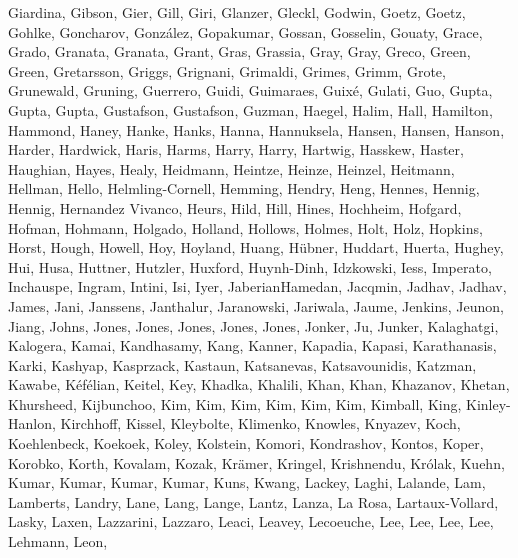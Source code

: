 \documentclass[times,tight]{aastex631}
\begin{document}
\begin{thebibliography}{}
{  {Giardina}, {Gibson}, {Gier}, {Gill}, {Giri}, {Glanzer}, {Gleckl}, {Godwin},
  {Goetz}, {Goetz}, {Gohlke}, {Goncharov}, {Gonz{\'a}lez}, {Gopakumar},
  {Gossan}, {Gosselin}, {Gouaty}, {Grace}, {Grado}, {Granata}, {Granata},
  {Grant}, {Gras}, {Grassia}, {Gray}, {Gray}, {Greco}, {Green}, {Green},
  {Gretarsson}, {Griggs}, {Grignani}, {Grimaldi}, {Grimes}, {Grimm}, {Grote},
  {Grunewald}, {Gruning}, {Guerrero}, {Guidi}, {Guimaraes}, {Guix{\'e}},
  {Gulati}, {Guo}, {Gupta}, {Gupta}, {Gupta}, {Gustafson}, {Gustafson},
  {Guzman}, {Haegel}, {Halim}, {Hall}, {Hamilton}, {Hammond}, {Haney}, {Hanke},
  {Hanks}, {Hanna}, {Hannuksela}, {Hansen}, {Hansen}, {Hanson}, {Harder},
  {Hardwick}, {Haris}, {Harms}, {Harry}, {Harry}, {Hartwig}, {Hasskew},
  {Haster}, {Haughian}, {Hayes}, {Healy}, {Heidmann}, {Heintze}, {Heinze},
  {Heinzel}, {Heitmann}, {Hellman}, {Hello}, {Helmling-Cornell}, {Hemming},
  {Hendry}, {Heng}, {Hennes}, {Hennig}, {Hennig}, {Hernandez Vivanco}, {Heurs},
  {Hild}, {Hill}, {Hines}, {Hochheim}, {Hofgard}, {Hofman}, {Hohmann},
  {Holgado}, {Holland}, {Hollows}, {Holmes}, {Holt}, {Holz}, {Hopkins},
  {Horst}, {Hough}, {Howell}, {Hoy}, {Hoyland}, {Huang}, {H{\"u}bner},
  {Huddart}, {Huerta}, {Hughey}, {Hui}, {Husa}, {Huttner}, {Hutzler},
  {Huxford}, {Huynh-Dinh}, {Idzkowski}, {Iess}, {Imperato}, {Inchauspe},
  {Ingram}, {Intini}, {Isi}, {Iyer}, {JaberianHamedan}, {Jacqmin}, {Jadhav},
  {Jadhav}, {James}, {Jani}, {Janssens}, {Janthalur}, {Jaranowski}, {Jariwala},
  {Jaume}, {Jenkins}, {Jeunon}, {Jiang}, {Johns}, {Jones}, {Jones}, {Jones},
  {Jones}, {Jones}, {Jonker}, {Ju}, {Junker}, {Kalaghatgi}, {Kalogera},
  {Kamai}, {Kandhasamy}, {Kang}, {Kanner}, {Kapadia}, {Kapasi}, {Karathanasis},
  {Karki}, {Kashyap}, {Kasprzack}, {Kastaun}, {Katsanevas}, {Katsavounidis},
  {Katzman}, {Kawabe}, {K{\'e}f{\'e}lian}, {Keitel}, {Key}, {Khadka},
  {Khalili}, {Khan}, {Khan}, {Khazanov}, {Khetan}, {Khursheed}, {Kijbunchoo},
  {Kim}, {Kim}, {Kim}, {Kim}, {Kim}, {Kim}, {Kimball}, {King}, {Kinley-Hanlon},
  {Kirchhoff}, {Kissel}, {Kleybolte}, {Klimenko}, {Knowles}, {Knyazev}, {Koch},
  {Koehlenbeck}, {Koekoek}, {Koley}, {Kolstein}, {Komori}, {Kondrashov},
  {Kontos}, {Koper}, {Korobko}, {Korth}, {Kovalam}, {Kozak}, {Kr{\"a}mer},
  {Kringel}, {Krishnendu}, {Kr{\'o}lak}, {Kuehn}, {Kumar}, {Kumar}, {Kumar},
  {Kumar}, {Kuns}, {Kwang}, {Lackey}, {Laghi}, {Lalande}, {Lam}, {Lamberts},
  {Landry}, {Lane}, {Lang}, {Lange}, {Lantz}, {Lanza}, {La Rosa},
  {Lartaux-Vollard}, {Lasky}, {Laxen}, {Lazzarini}, {Lazzaro}, {Leaci},
  {Leavey}, {Lecoeuche}, {Lee}, {Lee}, {Lee}, {Lee}, {Lehmann}, {Leon},
}
\end{thebibliography}
\end{document}
